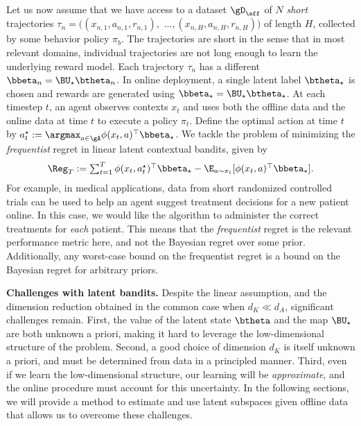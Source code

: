 Let us now assume that we have access to a dataset $\gD_{\off}$ of $N$ \textit{short} trajectories $\tau_n = ((x_{n,1}, a_{n,1}, r_{n,1}),$ $...,(x_{n,H}, a_{n,H}, r_{n,H}))$ of length $H$, collected by some behavior policy $\pi_b$. The trajectories are short in the sense that in most relevant domains, individual trajectories are not long enough to learn the underlying reward model. Each trajectory $\tau_n$ has a different $\bbeta_n = \BU_\star \btheta_n$. In online deployment, a single latent label $\btheta_\star$ is chosen and rewards are generated using $\bbeta_\star = \BU_\star \btheta_\star$. At each timestep $t$, an agent observes contexts $x_t$ and uses both the offline data and the online data at time $t$ to execute a policy $\pi_t$. Define the optimal action at time $t$ by $a^\star_t := \argmax_{a \in \gA} \phi(x_t, a)^\top \bbeta_\star$. We tackle the problem of minimizing the \textit{frequentist} regret in linear latent contextual bandits, given by
\begin{align*}
    \Reg_T := \textstyle{\sum_{t=1}^T \phi(x_t, a^\star_t)^\top \bbeta_\star -\E_{a \sim \pi_t}[\phi(x_t, a)^\top \bbeta_\star].}
\end{align*}
For example, in medical applications, data from short randomized controlled trials can be used to help an agent suggest treatment decisions for a new patient online. In this case, we would like the algorithm to administer the correct treatments for \textit{each} patient. This means that the \textit{frequentist} regret is the relevant performance metric here, and not the Bayesian regret over some prior. Additionally, any worst-case bound on the frequentist regret is a bound on the Bayesian regret for arbitrary priors.

\textbf{Challenges with latent bandits.} Despite the linear assumption, and the dimension reduction obtained in the common case when $d_K \ll d_A$, significant challenges remain. First, the value of the latent state $\btheta$ and the map $\BU_\star$ are both unknown a priori, making it hard to leverage the low-dimensional structure of the problem. Second, a good choice of dimension $d_K$ is itself unknown a priori, and must be determined from data in a principled manner. Third, even if we learn the low-dimensional structure, our learning will be \textit{approximate}, and the online procedure must account for this uncertainty. In the following sections, we will provide a method to estimate and use latent subspaces given offline data that allows us to overcome these challenges.

